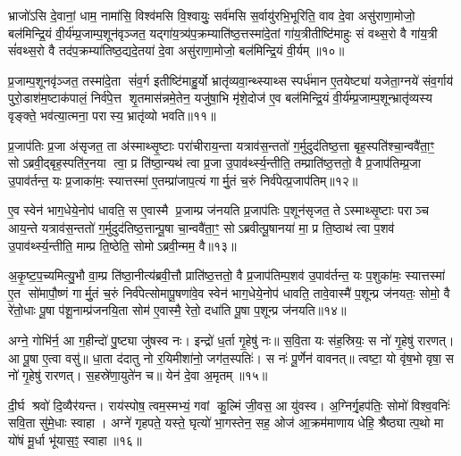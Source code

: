 भ्राजो॑ऽसि दे॒वानां॒ धाम॒ नामा॑सि॒ विश्व॑मसि वि॒श्वायुः॒ सर्व॑मसि स॒र्वायु॑रभि॒भूरिति॒ वाव दे॒वा असु॑राणा॒मोजो॒ बल॑मिन्द्रि॒यं वी॒र्य॑म्प्र॒जाम्प॒शून॑वृञ्जत॒ यद्गा॑य॒त्र्य॑प॒क्रम्याति॑ष्ठ॒त्तस्मा॑दे॒तां गा॑य॒त्रीतीष्टि॑माहुः सं वथ्स॒रो वै गा॑य॒त्री सं॑वथ्स॒रो वै तद॑प॒क्रम्या॑तिष्ठ॒द्यदे॒तया॑ दे॒वा असु॑राणा॒मोजो॒ बल॑मिन्द्रि॒यं वी॒र्यम्॥१०॥

प्र॒जाम्प॒शूनवृ॑ञ्जत॒ तस्मा॑दे॒ता सं॑व॒र्ग इतीष्टि॑माहु॒र्यो भ्रातृ॑व्यवा॒न्थ्स्याथ्स स्पर्ध॑मान ए॒तयेष्ट्या॑ यजेता॒ग्नये॑ संव॒र्गाय॑ पुरो॒डाश॑म॒ष्टाक॑पालं॒ निर्व॑पे॒त्त शृ॒तमास॑न्नमे॒तेन॒ यजु॑षा॒भि मृ॑शे॒दोज॑ ए॒व बल॑मिन्द्रि॒यं वी॒र्य॑म्प्र॒जाम्प॒शून्भ्रातृ॑व्यस्य वृङ्क्ते॒ भव॑त्या॒त्मना॒ परास्य॒ भ्रातृ॑व्यो भवति॥११॥

{\anuvakamend[{बल॑मस्ये॒तया॑ दे॒वा असु॑राणा॒मोजो॒ बल॑मिन्द्रि॒यं वी॒र्य॑म्पञ्च॑चत्वारिशच्च॥३॥}]}

प्र॒जाप॑तिः प्र॒जा अ॑सृजत॒ ता अ॑स्माथ्सृ॒ष्टाः परा॑चीराय॒न्ता यत्राव॑स॒न्ततो॑ ग॒र्मुदुद॑तिष्ठ॒त्ता बृह॒स्पति॑श्चा॒न्ववै॑ता॒ꣳ॒ सोऽब्रवी॒द्बृह॒स्पति॑र॒नया त्वा॒ प्र ति॑ष्ठा॒न्यथ॑ त्वा प्र॒जा उ॒पाव॑र्थ्स्य॒न्तीति॒ तम्प्राति॑ष्ठ॒त्ततो॒ वै प्र॒जाप॑तिम्प्र॒जा उ॒पाव॑र्तन्त॒ यः प्र॒जाका॑मः॒ स्यात्तस्मा॑ ए॒तम्प्रा॑जाप॒त्यं गार्मु॒तं च॒रुं निर्व॑पेत्प्र॒जाप॑तिम्॥१२॥

ए॒व स्वेन॑ भाग॒धेये॒नोप॑ धावति॒ स ए॒वास्मै प्र॒जाम्प्र ज॑नयति प्र॒जाप॑तिः प॒शून॑सृजत॒ तेऽस्माथ्सृ॒ष्टाः पराञ्च आय॒न्ते यत्राव॑स॒न्ततो॑ ग॒र्मुदुद॑तिष्ठ॒त्तान्पू॒षा चा॒न्ववै॑ता॒ꣳ॒ सोऽब्रवीत्पू॒षानया॑ मा॒ प्र ति॒ष्ठाथ॑ त्वा प॒शव॑ उ॒पाव॑र्थ्स्य॒न्तीति॒ माम्प्र ति॒ष्ठेति॒ सोमोऽब्रवी॒न्मम॒ वै॥१३॥

अ॒कृ॒ष्ट॒प॒च्यमित्यु॒भौ वा॒म्प्र ति॑ष्ठा॒नीत्य॑ब्रवी॒त्तौ प्राति॑ष्ठ॒त्ततो॒ वै प्र॒जाप॑तिम्प॒शव॑ उ॒पाव॑र्तन्त॒ यः प॒शुका॑मः॒ स्यात्तस्मा॑ ए॒त सो॑मापौ॒ष्णं गार्मु॒तं च॒रुं निर्व॑पेत्सोमापू॒षणा॑वे॒व स्वेन॑ भाग॒धेये॒नोप॑ धावति॒ तावे॒वास्मै॑ प॒शून्प्र ज॑नयतः॒ सोमो॒ वै रे॑तो॒धाः पू॒षा प॑शू॒नाम्प्र॑जनयि॒ता सोम॑ ए॒वास्मै॒ रेतो॒ दधा॑ति पू॒षा प॒शून्प्र ज॑नयति॥१४॥

{\anuvakamend[{व॒पे॒त्प्र॒जाप॑तिं॒ वै दधा॑ति पू॒षा त्रीणि॑ च॥४॥}]}

अग्ने॒ गोभि॑र्न॒ आ ग॒हीन्दो॑ पु॒ष्ट्या जु॑षस्व नः। इन्द्रो॑ ध॒र्ता गृ॒हेषु॑ नः॥ स॒वि॒ता यः स॑ह॒स्रियः॒ स नो॑ गृ॒हेषु॑ रारणत्। आ पू॒षा ए॒त्वा वसु॑॥ धा॒ता द॑दातु नो र॒यिमीशा॑नो॒ जग॑त॒स्पतिः॑। स नः॑ पू॒र्णेन॑ वावनत्॥ त्वष्टा॒ यो वृ॑ष॒भो वृषा॒ स नो॑ गृ॒हेषु॑ रारणत्। स॒हस्रे॑णा॒युते॑न च॥ येन॑ दे॒वा अ॒मृतम्॥१५॥

दी॒र्घ श्रवो॑ दि॒व्यैर॑यन्त। राय॑स्पोष॒ त्वम॒स्मभ्यं॒ गवां कु॒ल्मिं जी॒वस॒ आ यु॑वस्व। अ॒ग्निर्गृ॒हप॑तिः॒ सोमो॑ विश्व॒वनिः॑ सवि॒ता सु॑मे॒धाः स्वाहा। अग्ने॑ गृहपते॒ यस्ते॒ घृत्यो॑ भा॒गस्तेन॒ सह॒ ओज॑ आ॒क्रम॑माणाय धेहि॒ श्रैष्ठ्यात्प॒थो मा यो॑षं मू॒र्धा भू॑यास॒ꣵ॒ स्वाहा॥१६॥

